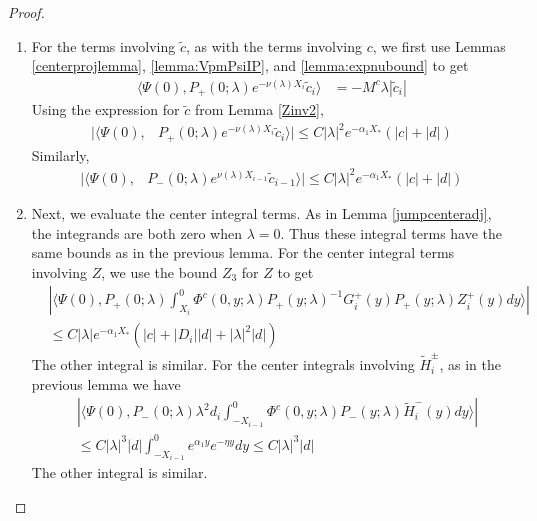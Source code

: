 \documentclass[thesis.tex]{subfiles}
\begin{document}
\begin{lemma}
\begin{proof}
\begin{enumerate}
\item For the terms involving $\tilde{c}$, as with the terms involving $c$, we first use Lemmas \ref{centerprojlemma}, \ref{lemma:VpmPsiIP}, and \cref{lemma:expnubound} to get
\begin{align*}
\langle \Psi(0), P_+(0; \lambda) e^{-\nu(\lambda) X_i}\tilde{c}_i \rangle &= -M^c \lambda |\tilde{c}_i|
\end{align*}
Using the expression for $\tilde{c}$ from Lemma \ref{Zinv2},
\begin{align*}
|\langle \Psi(0), &P_+(0; \lambda) e^{-\nu(\lambda) X_i}\tilde{c}_i \rangle| \leq C |\lambda|^2 e^{-\alpha_1 X_*} \left( |c| + |d| \right) 
\end{align*}
Similarly,
\begin{align*}
|\langle \Psi(0), &P_-(0; \lambda) e^{\nu(\lambda) X_{i-1}} \tilde{c}_{i-1} \rangle| \leq C |\lambda|^2 e^{-\alpha_1 X_*} \left( |c| + |d| \right)
\end{align*}

\item Next, we evaluate the center integral terms. As in Lemma \ref{jumpcenteradj}, the integrands are both zero when $\lambda = 0$. Thus these integral terms have the same bounds as in the previous lemma. For the center integral terms involving $Z$, we use the bound $Z_3$ for $Z$ to get
\begin{align*}
&\left| \langle \Psi(0), P_+(0; \lambda) \int_{X_i}^0 \Phi^c(0, y; \lambda) P_+(y; \lambda)^{-1} G_i^+(y) P_+(y; \lambda) Z_i^+(y) dy \rangle \right| \\
&\leq C |\lambda| e^{-\alpha_1 X_*}\left(|c| + |D_i||d| + |\lambda|^2|d|\right)
\end{align*}
The other integral is similar. For the center integrals involving $\tilde{H}_i^\pm$, as in the previous lemma we have
\begin{align*}
&\left| \langle \Psi(0), P_-(0; \lambda) \lambda^2 d_i \int_{-X_{i-1}}^0 \Phi^c(0, y; \lambda) P_-(y; \lambda) \tilde{H}_i^-(y) dy \rangle \right| \\
&\leq C |\lambda|^3 |d| \int_{-X_{i-1}}^0 e^{\alpha_1 y} e^{-\eta y} dy \leq C |\lambda|^3 |d| 
\end{align*}
The other integral is similar.


\end{enumerate}
\end{proof}
\end{lemma}
\end{document}

